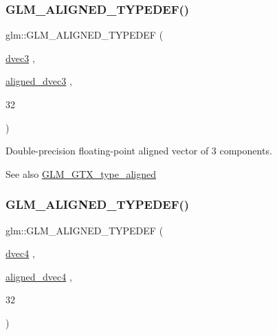 \subsubsection{\texorpdfstring{G\+L\+M\+\_\+\+A\+L\+I\+G\+N\+E\+D\+\_\+\+T\+Y\+P\+E\+D\+E\+F()}{GLM\_ALIGNED\_TYPEDEF()}\hspace{0.1cm}{\footnotesize\ttfamily [157/209]}}
{\footnotesize\ttfamily glm\+::\+G\+L\+M\+\_\+\+A\+L\+I\+G\+N\+E\+D\+\_\+\+T\+Y\+P\+E\+D\+EF (\begin{DoxyParamCaption}\item[{\hyperlink{group__core__types_ga7f3287f952e6ccb481231368091702ac}{dvec3}}]{,  }\item[{\hyperlink{group__gtc__type__aligned_ga82da11893fbac3bda647c9de9da62693}{aligned\+\_\+dvec3}}]{,  }\item[{32}]{ }\end{DoxyParamCaption})}

Double-\/precision floating-\/point aligned vector of 3 components. \begin{DoxySeeAlso}{See also}
\hyperlink{group__gtx__type__aligned}{G\+L\+M\+\_\+\+G\+T\+X\+\_\+type\+\_\+aligned} 
\end{DoxySeeAlso}
\mbox{\label{group__gtx__type__aligned_ga687d5b8f551d5af32425c0b2fba15e99}} 
\subsubsection{\texorpdfstring{G\+L\+M\+\_\+\+A\+L\+I\+G\+N\+E\+D\+\_\+\+T\+Y\+P\+E\+D\+E\+F()}{GLM\_ALIGNED\_TYPEDEF()}\hspace{0.1cm}{\footnotesize\ttfamily [158/209]}}
{\footnotesize\ttfamily glm\+::\+G\+L\+M\+\_\+\+A\+L\+I\+G\+N\+E\+D\+\_\+\+T\+Y\+P\+E\+D\+EF (\begin{DoxyParamCaption}\item[{\hyperlink{group__core__types_ga0824ceed7ec3b2fba89765501c1540b5}{dvec4}}]{,  }\item[{\hyperlink{group__gtc__type__aligned_ga502d8d084a488118c9a5466d73ba1a46}{aligned\+\_\+dvec4}}]{,  }\item[{32}]{ }\end{DoxyParamCaption})}


